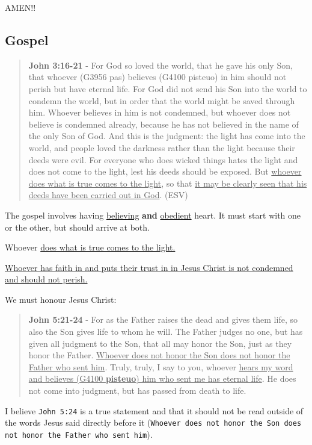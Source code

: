 \documentclass[11pt]{article}
\begin{document}
AMEN!!

\subsection{Gospel}
\label{sec:org43bd4e4}
\begin{quote}
\textbf{John 3:16-21} - For God so loved the world, that he gave his only Son, that whoever (G3956 pas) believes (G4100 pisteuo) in him should not perish but have eternal life. For God did not send his Son into the world to condemn the world, but in order that the world might be saved through him. Whoever believes in him is not condemned, but whoever does not believe is condemned already, because he has not believed in the name of the only Son of God. And this is the judgment: the light has come into the world, and people loved the darkness rather than the light because their deeds were evil. For everyone who does wicked things hates the light and does not come to the light, lest his deeds should be exposed. But \uline{whoever does what is true comes to the light}, so that \uline{it may be clearly seen that his deeds have been carried out in God}. (ESV)
\end{quote}

The gospel involves having \uline{believing} \textbf{and} \uline{obedient} heart. It must start with one or the other, but should arrive at both.

Whoever \uline{does what is true comes to the light.}

\uline{Whoever has faith in and puts their trust in in Jesus Christ is not condemned and should not perish.}

We must honour Jesus Christ:

\begin{quote}
\textbf{John 5:21-24} - For as the Father raises the dead and gives them life, so also the Son gives life to whom he will. The Father judges no one, but has given all judgment to the Son, that all may honor the Son, just as they honor the Father. \uline{Whoever does not honor the Son does not honor the Father who sent him}. Truly, truly, I say to you, whoever \uline{hears my word and believes (G4100 \textbf{pisteuo}) him who sent me has eternal life}. He does not come into judgment, but has passed from death to life.
\end{quote}

I believe \texttt{John 5:24} is a true statement and that it should not be read outside of the words Jesus said directly before it (\texttt{Whoever does not honor the Son does not honor the Father who sent him}).
\end{document}
